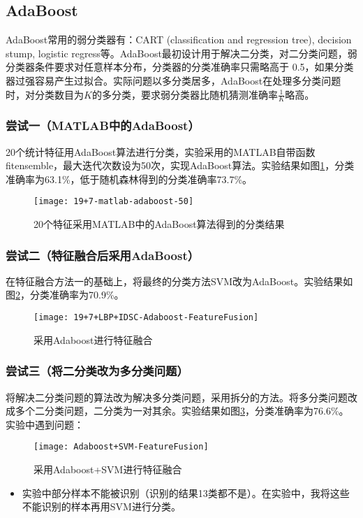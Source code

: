 \subsection{AdaBoost}
AdaBoost常用的弱分类器有：CART (classification and regression tree), decision stump, logistic regress等。AdaBoost最初设计用于解决二分类，对二分类问题，弱分类器条件要求对任意样本分布，分类器的分类准确率只需略高于 0.5，如果分类器过强容易产生过拟合。实际问题以多分类居多，AdaBoost在处理多分类问题时，对分类数目为$K$的多分类，要求弱分类器比随机猜测准确率$\frac{1}{K}$略高。

\subsubsection{尝试一（MATLAB中的AdaBoost）}
20个统计特征用AdaBoost算法进行分类，实验采用的MATLAB自带函数fitensemble，最大迭代次数设为50次，实现AdaBoost算法。实验结果如图\ref{fig:19+7-matlab-adaboost-50}，分类准确率为63.1\%，低于随机森林得到的分类准确率73.7\%。
\begin{figure}[!ht]
\centering
\texttt{[image: 19+7-matlab-adaboost-50]}
\caption{20个特征采用MATLAB中的AdaBoost算法得到的分类结果}
\label{fig:19+7-matlab-adaboost-50}
\end{figure}

\subsubsection{尝试二（特征融合后采用AdaBoost）}
在特征融合方法一的基础上，将最终的分类方法SVM改为AdaBoost。实验结果如图\ref{fig:19+7+LBP+IDSC-Adaboost-FeatureFusion}，分类准确率为70.9\%。
\begin{figure}[!ht]
\centering
\texttt{[image: 19+7+LBP+IDSC-Adaboost-FeatureFusion]}
\caption{采用Adaboost进行特征融合}
\label{fig:19+7+LBP+IDSC-Adaboost-FeatureFusion}
\end{figure}

\subsubsection{尝试三（将二分类改为多分类问题）}
将解决二分类问题的算法改为解决多分类问题，采用拆分的方法。将多分类问题改成多个二分类问题，二分类为一对其余。实验结果如图\ref{fig:Adaboost+SVM-FeatureFusion}，分类准确率为76.6\%。实验中遇到问题：
\begin{figure}[!ht]
\centering
\texttt{[image: Adaboost+SVM-FeatureFusion]}
\caption{采用Adaboost+SVM进行特征融合}
\label{fig:Adaboost+SVM-FeatureFusion}
\end{figure}
\begin{itemize}
\item 实验中部分样本不能被识别（识别的结果13类都不是）。在实验中，我将这些不能识别的样本再用SVM进行分类。
\end{itemize}

